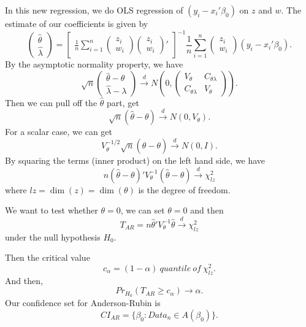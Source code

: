 \documentclass[11pt,a4paper]{amsart}
\theoremstyle{plain}
\theoremstyle{definition}
\begin{document}
	\begin{framed}
		In this new regression, we do OLS regression of $(y_{i}-x_{i}'\beta_{0})$ on $z$ and $w$. The estimate of our coefficients is given by
		\[	\begin{pmatrix}
		\hat{\theta} \\
		\hat{\lambda}
		\end{pmatrix}
		=	\left[ \begin{matrix}
			\frac{1}{n} \sum_{i=1}^{n} 
			\begin{pmatrix}
			z_{i} \\
			w_{i}
			\end{pmatrix}
			\begin{pmatrix}
			z_{i} \\
			w_{i}
			\end{pmatrix}'
		\end{matrix} \right]^{-1} \frac{1}{n}\sum_{i=1}^{n} 
			\begin{pmatrix}
		z_{i} \\
		w_{i}
		\end{pmatrix}(y_{i}-x_{i}'\beta_{0}). 	\]
		By the asymptotic normality property, we have 
		\[	\sqrt{n} 
		\begin{pmatrix}
		\hat{\theta} - \theta \\
		\hat{\lambda} - \lambda
		\end{pmatrix} \stackrel{d}{\longrightarrow} N(0, \begin{pmatrix}
		V_{\theta} & C_{\theta\lambda}	\\
		C_{\theta\lambda}	 & V_{\theta} 
		\end{pmatrix}).	\]
	 	Then we can pull off the $\hat{\theta}$ part, get 
	 		\[	\sqrt{n}(\hat{\theta} - \theta) \stackrel{d}{\longrightarrow} N(0,V_{\theta}). 	\]
	 	For a scalar case, we can get
	 	\[	V_{\theta}^{-1/2}\sqrt{n}(\hat{\theta}-\theta) \stackrel{d}{\longrightarrow} N(0,I). 	\]
	 	By squaring the terms (inner product) on the left hand side, we have 
	 	\[	n(\hat{\theta} - \theta)' V_{\theta}^{-1} (\hat{\theta} - \theta)  \stackrel{d}{\longrightarrow}  \chi^{2}_{lz}	\]
	 	where $lz = \dim(z) = \dim(\theta)$ is the degree of freedom.\par 
	 	We want to test whether $\theta = 0$, we can set $\theta = 0$ and then 
	 	\[	T_{AR} = n\hat{\theta}' V_{\theta}^{-1} \hat{\theta}  \stackrel{d}{\longrightarrow} \chi^{2}_{lz}	\]
	 	under the null hypothesis $H_{0}$.\par 
	 	Then the critical value 
	 	\[	c_{\alpha} = (1-\alpha)~quantile~of~\chi^{2}_{lz}.	\]
	 	And then,
	 	\[	Pr_{H_{0}} (T_{AR} \geq c_{\alpha}) \rightarrow \alpha.	\]
	 	Our confidence set for Anderson-Rubin is 
	 	\[	CI_{AR} = \{\beta_{0} \colon Data_{n} \in A(\beta_{0})\}.	\]
	\end{framed} 
\end{document}
